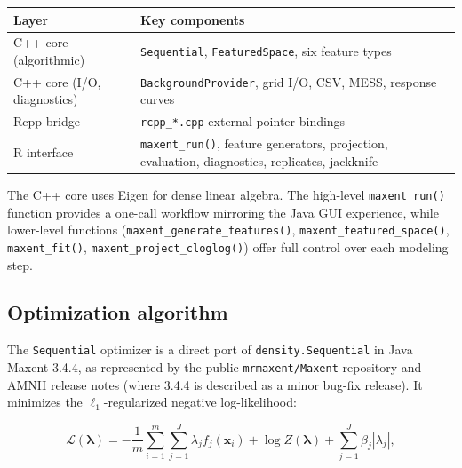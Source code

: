 \documentclass[10pt,letterpaper]{article}
\newcounter{none} %
\begin{document}
{\def\LTcaptype{none} %
\begin{longtable}[]{@{}
  >{\raggedright\arraybackslash}p{}
  >{\raggedright\arraybackslash}p{}@{}}
\toprule\noalign{}
\begin{minipage}[b]{\linewidth}\raggedright
Layer
\end{minipage} & \begin{minipage}[b]{\linewidth}\raggedright
Key components
\end{minipage} \\
\midrule\noalign{}
\endhead
\bottomrule\noalign{}
\endlastfoot
C++ core (algorithmic) & \texttt{Sequential}, \texttt{FeaturedSpace},
six feature types \\
C++ core (I/O, diagnostics) & \texttt{BackgroundProvider}, grid I/O,
CSV, MESS, response curves \\
Rcpp bridge & \texttt{rcpp\_*.cpp} external-pointer bindings
\cite{Eddelbuettel2013} \\
R interface & \texttt{maxent\_run()}, feature generators, projection,
evaluation, diagnostics, replicates, jackknife \\
\end{longtable}
}

The C++ core uses Eigen \cite{Guennebaud2010} for dense linear algebra.
The high-level \texttt{maxent\_run()} function provides a one-call
workflow mirroring the Java GUI experience, while lower-level functions
(\texttt{maxent\_generate\_features()},
\texttt{maxent\_featured\_space()}, \texttt{maxent\_fit()},
\texttt{maxent\_project\_cloglog()}) offer full control over each
modeling step.

\subsection*{Optimization algorithm}

The \texttt{Sequential} optimizer is a direct port of
\texttt{density.Sequential} in Java Maxent 3.4.4, as represented by the
public \texttt{mrmaxent/Maxent} repository and AMNH release notes (where
3.4.4 is described as a minor bug-fix release). It minimizes the
\(\ell_1\)-regularized negative log-likelihood:

\[
\mathcal{L}(\boldsymbol{\lambda}) = -\frac{1}{m}\sum_{i=1}^{m}
\sum_{j=1}^{J} \lambda_j f_j(\mathbf{x}_i) + \log Z(\boldsymbol{\lambda})
+ \sum_{j=1}^{J} \beta_j |\lambda_j|,
\]
\end{document}
